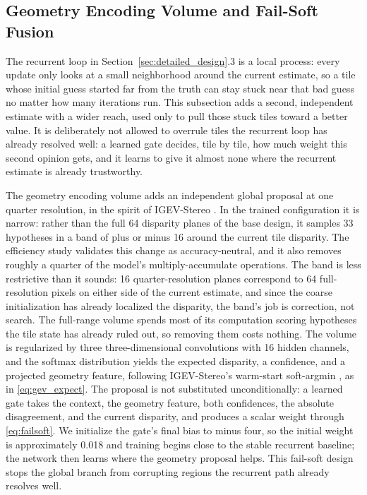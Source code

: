 \subsection{Geometry Encoding Volume and Fail-Soft Fusion}
The recurrent loop in Section~\ref{sec:detailed_design}.3 is a local
process: every update only looks at a small neighborhood around the
current estimate, so a tile whose initial guess started far from the
truth can stay stuck near that bad guess no matter how many iterations
run. This subsection adds a second, independent estimate with a wider
reach, used only to pull those stuck tiles toward a better value. It is
deliberately not allowed to overrule tiles the recurrent loop has
already resolved well: a learned gate decides, tile by tile, how much
weight this second opinion gets, and it learns to give it almost none
where the recurrent estimate is already trustworthy.

The geometry encoding volume adds an independent global proposal at one
quarter resolution, in the spirit of IGEV-Stereo \cite{xu2023igev}. In
the trained configuration it is narrow: rather than the full 64 disparity
planes of the base design, it samples 33 hypotheses in a band of plus or
minus 16 around the current tile disparity. The efficiency study
validates this change as accuracy-neutral, and it also removes roughly a
quarter of the model's multiply-accumulate operations. The band is less restrictive than it sounds: 16
quarter-resolution planes correspond to 64 full-resolution pixels on
either side of the current estimate, and since the coarse initialization
has already localized the disparity, the band's job is correction, not
search. The full-range volume spends most of its computation scoring
hypotheses the tile state has already ruled out, so removing them costs
nothing. The volume is regularized by three three-dimensional
convolutions with 16 hidden channels, and the softmax distribution yields
the expected disparity, a confidence, and a projected geometry feature,
following IGEV-Stereo's warm-start soft-argmin \cite{xu2023igev}, as in
\eqref{eq:gev_expect}. The proposal is not substituted
unconditionally: a learned gate takes the context, the geometry feature,
both confidences, the absolute disagreement, and the current disparity,
and produces a scalar weight through \eqref{eq:failsoft}. We initialize
the gate's final bias to minus four, so the initial weight is
approximately 0.018 and training begins close to the stable recurrent
baseline; the network then learns where the geometry proposal helps. This
fail-soft design stops the global branch from corrupting regions the
recurrent path already resolves well.

